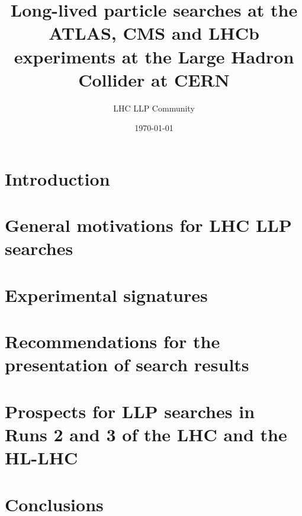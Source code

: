 \documentclass[a4paper,debug,notitlepage,nobib]{tufte-book}
\title{Long-lived particle searches at the ATLAS, CMS and LHCb \\ \smallskip \noindent experiments at the Large Hadron Collider at CERN}
\author{LHC LLP Community}
\date{\today}
\begin{document}
\setcounter{secnumdepth}{3} %



\setcounter{tocdepth}{3}
\tableofcontents
 
\pagebreak

\chapter{Introduction}
\label{sec:Introduction}


\chapter{General motivations for LHC LLP searches}
\label{subsec:motivation}


\chapter{Experimental signatures}
\label{subsec:signatures}


\chapter{Recommendations for the presentation of search results}
\label{app:recommendations}


\chapter{Prospects for LLP searches in Runs 2 and 3 of the LHC and the HL-LHC}
\label{sec:future} 


\chapter{Conclusions}
\label{chapter:conclusions}

 


\appendix

%
\end{document}
